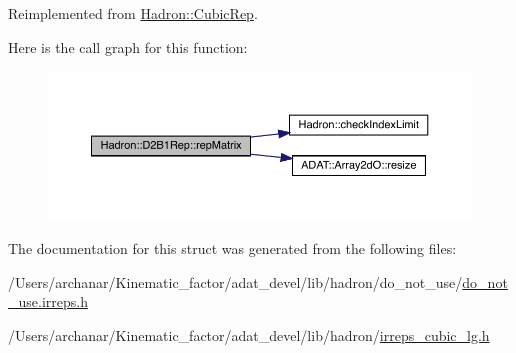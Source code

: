 Reimplemented from \mbox{\hyperlink{structHadron_1_1CubicRep_ac5d7e9e6f4ab1158b5fce3e4ad9e8005}{Hadron\+::\+Cubic\+Rep}}.

Here is the call graph for this function\+:
\nopagebreak
\begin{figure}[H]
\begin{center}
\leavevmode
\includegraphics[width=350pt]{d1/d67/structHadron_1_1D2B1Rep_a3d7f68800d29238030406bf06553360f_cgraph}
\end{center}
\end{figure}


The documentation for this struct was generated from the following files\+:\begin{DoxyCompactItemize}
\item 
/\+Users/archanar/\+Kinematic\+\_\+factor/adat\+\_\+devel/lib/hadron/do\+\_\+not\+\_\+use/\mbox{\hyperlink{do__not__use_8irreps_8h}{do\+\_\+not\+\_\+use.\+irreps.\+h}}\item 
/\+Users/archanar/\+Kinematic\+\_\+factor/adat\+\_\+devel/lib/hadron/\mbox{\hyperlink{lib_2hadron_2irreps__cubic__lg_8h}{irreps\+\_\+cubic\+\_\+lg.\+h}}\end{DoxyCompactItemize}
